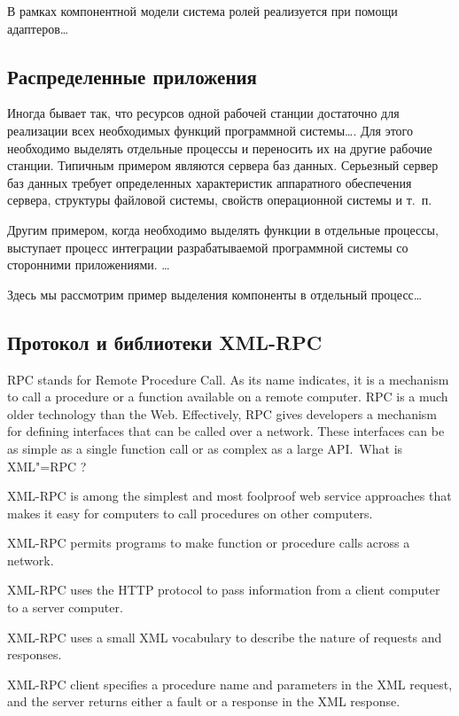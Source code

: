 \documentclass[a4paper,openany,twoside,final]{book}
\begin{document}
В рамках компонентной модели система ролей реализуется при помощи адаптеров\ldots{}

\subsection{Распределенные приложения}
\label{sec:distributedapps}

Иногда бывает так, что ресурсов одной рабочей станции достаточно для реализации всех необходимых функций программной системы\ldots{}. Для этого необходимо выделять отдельные процессы и переносить их на другие рабочие станции.  Типичным примером являются сервера баз данных.  Серьезный сервер баз данных требует определенных характеристик аппаратного обеспечения сервера, структуры файловой системы, свойств операционной системы и т.~п.

Другим примером, когда необходимо выделять функции в отдельные процессы, выступает процесс интеграции разрабатываемой программной системы со сторонними приложениями.  \ldots{}

Здесь мы рассмотрим пример выделения компоненты в отдельный процесс\ldots{}

\subsection{Протокол и библиотеки XML-RPC}
\label{sec:xmlrpc}

RPC stands for Remote Procedure Call. As its name indicates, it is a mechanism to call a procedure or a function available on a remote computer. RPC is a much older technology than the Web. Effectively, RPC gives developers a mechanism for defining interfaces that can be called over a network. These interfaces can be as simple as a single function call or as complex as a large API.~What is XML"=RPC ?

XML-RPC is among the simplest and most foolproof web service approaches that makes it easy for computers to call procedures on other computers.

    XML-RPC permits programs to make function or procedure calls across a network.

    XML-RPC uses the HTTP protocol to pass information from a client computer to a server computer.

    XML-RPC uses a small XML vocabulary to describe the nature of requests and responses.

    XML-RPC client specifies a procedure name and parameters in the XML request, and the server returns either a fault or a response in the XML response.
\end{document}
